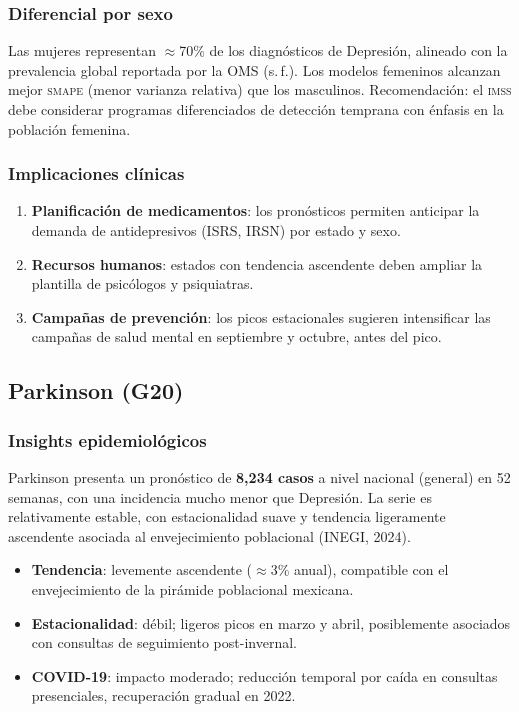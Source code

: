 \documentclass[12pt, letterpaper]{article}
\newcommand{\smape}{\textnormal{\textsc{smape}}}
\newcommand{\imss}{\textnormal{\textsc{imss}}}
\begin{document}
\subsubsection{Diferencial por sexo}

Las mujeres representan $\approx$70\% de los diagnósticos de Depresión, alineado con la prevalencia global reportada por la OMS (s.\,f.). Los modelos femeninos alcanzan mejor \smape{} (menor varianza relativa) que los masculinos. Recomendación: el {\imss} debe considerar programas diferenciados de detección temprana con énfasis en la población femenina.

\subsubsection{Implicaciones clínicas}

\begin{enumerate}[noitemsep]
    \item \textbf{Planificación de medicamentos}: los pronósticos permiten anticipar la demanda de antidepresivos (ISRS, IRSN) por estado y sexo.
    \item \textbf{Recursos humanos}: estados con tendencia ascendente deben ampliar la plantilla de psicólogos y psiquiatras.
    \item \textbf{Campañas de prevención}: los picos estacionales sugieren intensificar las campañas de salud mental en septiembre y octubre, antes del pico.
\end{enumerate}

\subsection{Parkinson (G20)}\label{subsec:parkinson}

\subsubsection{Insights epidemiológicos}

Parkinson presenta un pronóstico de \textbf{8,234 casos} a nivel nacional (general) en 52 semanas, con una incidencia mucho menor que Depresión. La serie es relativamente estable, con estacionalidad suave y tendencia ligeramente ascendente asociada al envejecimiento poblacional (INEGI, 2024).

\begin{itemize}[noitemsep]
    \item \textbf{Tendencia}: levemente ascendente ($\approx$3\% anual), compatible con el envejecimiento de la pirámide poblacional mexicana.
    \item \textbf{Estacionalidad}: débil; ligeros picos en marzo y abril, posiblemente asociados con consultas de seguimiento post-invernal.
    \item \textbf{COVID-19}: impacto moderado; reducción temporal por caída en consultas presenciales, recuperación gradual en 2022.
\end{itemize}
\end{document}
